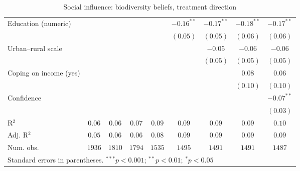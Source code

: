 \begin{table}[h]
\begin{center}
\begin{tabular}{l c c c c c c c c}
Education (numeric)                                                             &               &               &               &               & $-0.16^{**}$  & $-0.17^{**}$  & $-0.18^{**}$  & $-0.17^{**}$  \\
                                                                                &               &               &               &               & $(0.05)$      & $(0.05)$      & $(0.06)$      & $(0.06)$      \\
Urban–rural scale                                                               &               &               &               &               &               & $-0.05$       & $-0.06$       & $-0.06$       \\
                                                                                &               &               &               &               &               & $(0.05)$      & $(0.05)$      & $(0.05)$      \\
Coping on income (yes)                                                          &               &               &               &               &               &               & $0.08$        & $0.06$        \\
                                                                                &               &               &               &               &               &               & $(0.10)$      & $(0.10)$      \\
Confidence                                                                      &               &               &               &               &               &               &               & $-0.07^{**}$  \\
                                                                                &               &               &               &               &               &               &               & $(0.03)$      \\
\hline
R$^2$                                                                           & $0.06$        & $0.06$        & $0.07$        & $0.09$        & $0.09$        & $0.09$        & $0.09$        & $0.10$        \\
Adj. R$^2$                                                                      & $0.05$        & $0.06$        & $0.06$        & $0.08$        & $0.09$        & $0.09$        & $0.09$        & $0.09$        \\
Num. obs.                                                                       & $1936$        & $1810$        & $1794$        & $1535$        & $1495$        & $1491$        & $1491$        & $1487$        \\
\hline
\multicolumn{9}{l}{\scriptsize{Standard errors in parentheses. $^{***}p<0.001$; $^{**}p<0.01$; $^{*}p<0.05$}}
\end{tabular}
\caption{Social influence: biodiversity beliefs, treatment direction}
\label{table:social_influence_bioemi_treatment_direction}
\end{center}
\end{table}
